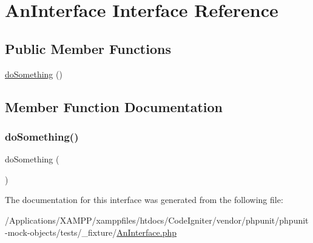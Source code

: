 \hypertarget{interface_an_interface}{}\section{An\+Interface Interface Reference}
\label{interface_an_interface}
\subsection*{Public Member Functions}
\begin{DoxyCompactItemize}
\item 
\mbox{\hyperlink{interface_an_interface_abe91a8abe16159c0096d570ee6ccc985}{do\+Something}} ()
\end{DoxyCompactItemize}


\subsection{Member Function Documentation}
\mbox{\label{interface_an_interface_abe91a8abe16159c0096d570ee6ccc985}} 
\subsubsection{\texorpdfstring{do\+Something()}{doSomething()}}
{\footnotesize\ttfamily do\+Something (\begin{DoxyParamCaption}{ }\end{DoxyParamCaption})}



The documentation for this interface was generated from the following file\+:\begin{DoxyCompactItemize}
\item 
/\+Applications/\+X\+A\+M\+P\+P/xamppfiles/htdocs/\+Code\+Igniter/vendor/phpunit/phpunit-\/mock-\/objects/tests/\+\_\+fixture/\mbox{\hyperlink{_an_interface_8php}{An\+Interface.\+php}}\end{DoxyCompactItemize}
